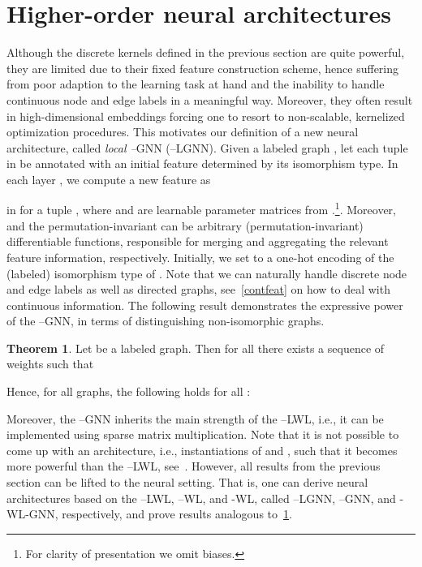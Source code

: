 \documentclass{article}
\theoremstyle{definition}
\newtheorem{theorem}{Theorem}
\newcommand{\new}[1]{\emph{#1}}
\newcommand{\kwl}{-\textsf{WL}\xspace}
\newcommand{\deltakwl}{--\textsf{WL}\xspace}
\newcommand{\localkwl}{--\textsf{LWL}\xspace}
\newcommand{\pluskwl}{--\textsf{LWL}\xspace}
\newcommand{\deltakwln}{--\textsf{GNN}\xspace}
\newcommand{\localkwln}{--\textsf{LGNN}\xspace}
\newcommand{\kwln}{-\textsf{WL-GNN}\xspace}
\begin{document}
\section{Higher-order neural architectures}\label{neural}
Although the discrete kernels defined in the previous section are quite powerful, they are limited due to their fixed feature construction scheme, hence suffering from poor adaption to the learning task at hand and the inability to handle continuous node and edge labels in a meaningful way. Moreover, they often result in high-dimensional embeddings forcing one to resort to non-scalable, kernelized optimization procedures. 
This motivates our definition of a new neural architecture, called \new{local --}\textsf{GNN} (\localkwln).
Given a labeled graph , let each tuple  in  be annotated with an initial feature  determined by its isomorphism type. 
In each layer ,  we compute a new feature  as 

in   for a tuple , where  and  are learnable parameter matrices from .\footnote{For clarity of presentation we omit biases.}. Moreover,  and the permutation-invariant  can be arbitrary (permutation-invariant) differentiable functions, responsible for merging and aggregating the relevant feature information, respectively. Initially, we set  to a one-hot encoding of the (labeled) isomorphism type of . Note that we can naturally handle discrete node and edge labels as well as directed graphs, see~\cref{contfeat} on how to deal with continuous information. The following result demonstrates the expressive power of the \deltakwln, in terms of distinguishing non-isomorphic graphs. 
\begin{theorem}\label{equal}
	Let  be a labeled graph. Then for all \mbox{} there exists a sequence of weights  such that 
	
	Hence, for all graphs, the following holds for all :
	
\end{theorem}     
Moreover, the \deltakwln inherits the main strength of the \localkwl, i.e., it can be implemented using sparse matrix multiplication. Note that it is not possible to come up with an architecture, i.e., instantiations of  and  , such that it becomes more powerful than the \localkwl, see~\cite{Mor+2019}. However, all results from the previous section can be lifted to the neural setting. That is, one can derive neural architectures based on the \pluskwl, \deltakwl, and \kwl, called \localkwln\hspace{-3pt}, \deltakwln, and \kwln, respectively, and prove results analogous to~\cref{equal}.
\end{document}

